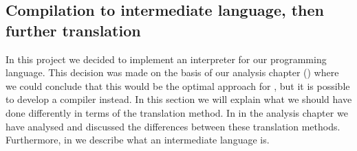 \subsection{Compilation to intermediate language, then further translation}
\label{sec:compiletointermediate}

In this project we decided to implement an interpreter for our programming
language. This decision was made on the basis of our analysis chapter
() where we could conclude that this would be the optimal
approach for \productname{}, but it is possible to develop a compiler instead. In
this section we will explain what we should have done differently in terms of
the translation method. In  in the
analysis chapter we have analysed and discussed the differences between these
translation methods. Furthermore, in  we
describe what an intermediate language is.

%
%
%
